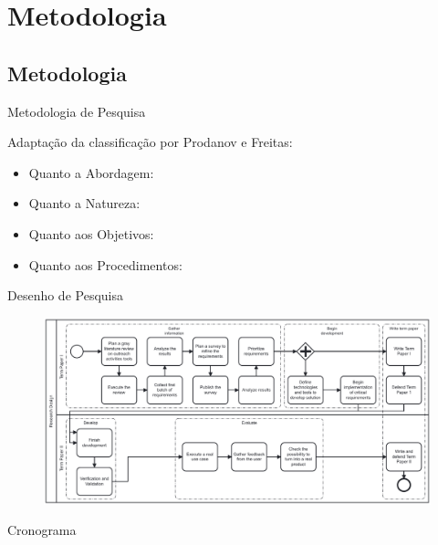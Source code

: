 \section{Metodologia}
\subsection*{Metodologia}

\begin{frame}{{\sffamily Metodologia de Pesquisa}}
  \begin{block}{}
    Adaptação da classificação por Prodanov e Freitas:
    \begin{itemize}
      \item Quanto a Abordagem:
      \item Quanto a Natureza: %
      \item Quanto aos Objetivos: %
      \item Quanto aos Procedimentos: %
    \end{itemize}
  \end{block}
\end{frame}

\begin{frame}{{\sffamily Desenho de Pesquisa}}
  \begin{figure}
    \centering
    \includegraphics[width=1\textwidth, ]{imagens/2-research design.pdf}
  \end{figure}
\end{frame}

\begin{frame}{{\sffamily Cronograma}}
  
\end{frame}